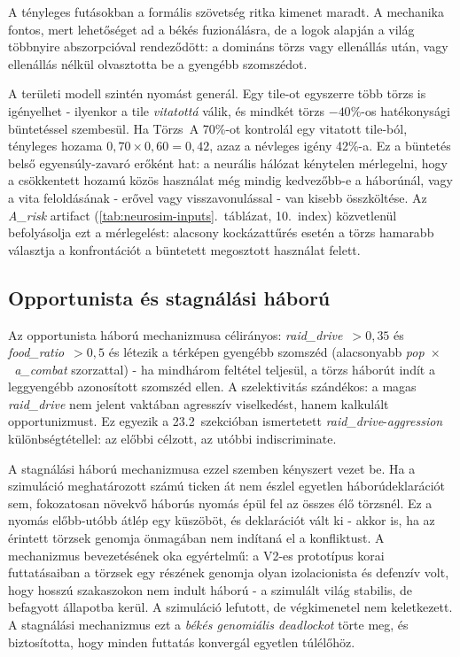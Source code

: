 A tényleges futásokban a formális szövetség ritka kimenet maradt. A mechanika
fontos, mert lehetőséget ad a békés fuzionálásra, de a logok alapján a világ
többnyire abszorpcióval rendeződött: a domináns törzs vagy ellenállás után,
vagy ellenállás nélkül olvasztotta be a gyengébb szomszédot.

A területi modell szintén nyomást generál. Egy tile-ot egyszerre több törzs is igényelhet -
ilyenkor a tile \textit{vitatottá} válik, és mindkét törzs $-40\%$-os hatékonysági
büntetéssel szembesül. Ha Törzs~A 70\%-ot kontrolál egy vitatott tile-ból, tényleges
hozama $0{,}70 \times 0{,}60 = 0{,}42$, azaz a névleges igény 42\%-a. Ez a büntetés
belső egyensúly-zavaró erőként hat: a neurális hálózat kénytelen mérlegelni, hogy
a csökkentett hozamú közös használat még mindig kedvezőbb-e a háborúnál, vagy a
vita feloldásának - erővel vagy visszavonulással - van kisebb összköltése.
Az \textit{A\_risk} artifact (\ref{tab:neurosim-inputs}.~táblázat, 10.~index)
közvetlenül befolyásolja ezt a mérlegelést: alacsony kockázattűrés esetén a törzs
hamarabb választja a konfrontációt a büntetett megosztott használat felett.

\subsection*{Opportunista és stagnálási háború}

Az opportunista háború mechanizmusa célirányos: \textit{raid\_drive}~$> 0{,}35$
és \textit{food\_ratio}~$> 0{,}5$ és létezik a térképen gyengébb szomszéd
(alacsonyabb \textit{pop~$\times$~a\_combat} szorzattal) - ha mindhárom feltétel
teljesül, a törzs háborút indít a leggyengébb azonosított szomszéd ellen.
A szelektivitás szándékos: a magas \textit{raid\_drive} nem jelent vaktában
agresszív viselkedést, hanem kalkulált opportunizmust. Ez egyezik a 23.2~szekcióban
ismertetett \textit{raid\_drive}-\textit{aggression} különbségtétellel: az előbbi
célzott, az utóbbi indiscriminate.

A stagnálási háború mechanizmusa ezzel szemben kényszert vezet be. Ha a szimuláció
meghatározott számú ticken át nem észlel egyetlen háborúdeklarációt sem, fokozatosan
növekvő háborús nyomás épül fel az összes élő törzsnél. Ez a nyomás előbb-utóbb
átlép egy küszöböt, és deklarációt vált ki - akkor is, ha az érintett törzsek genomja
önmagában nem indítaná el a konfliktust. A mechanizmus bevezetésének oka egyértelmű:
a V2-es prototípus korai futtatásaiban a törzsek egy részének genomja olyan izolacionista
és defenzív volt, hogy hosszú szakaszokon nem indult háború - a szimulált világ stabilis,
de befagyott állapotba kerül. A szimuláció lefutott, de végkimenetel nem keletkezett.
A stagnálási mechanizmus ezt a \textit{békés genomiális deadlockot} törte meg, és
biztosította, hogy minden futtatás konvergál egyetlen túlélőhöz.

